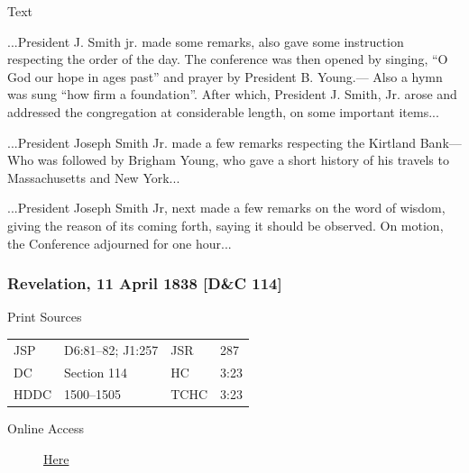 				\begin{description}
					\item[Text]
				\end{description}
				
					...President J. Smith jr. made some remarks, also gave some instruction respecting the order of the day. The conference was then opened by singing, ``O God our hope in ages past'' and prayer by President B. Young.--- Also a hymn was sung ``how firm a foundation''. After which, President J. Smith, Jr. arose and addressed the congregation at considerable length, on some important items...
					
					...President Joseph Smith Jr. made a few remarks respecting the Kirtland Bank--- Who was followed by Brigham Young, who gave a short history of his travels to Massachusetts and New York...
					
					...President Joseph Smith Jr, next made a few remarks on the word of wisdom, giving the reason of its coming forth, saying it should be observed. On motion, the Conference adjourned for one hour...
					
		\subsubsection{Revelation, 11 April 1838 [D\&C 114]}
			\label{EMS-1838-JS-11-APR-1838}
			
			\begin{description}
					\item[Print Sources]
				\end{description}

					\begin{tabular}{p{0.5in}p{1in}p{0.5in}p{1in}}
					JSP	 	& D6:81--82; J1:257				& JSR 		& 287 \\
					DC	 	& Section 114		& HC 		& 3:23 \\
					HDDC 	& 1500--1505		& TCHC 		& 3:23 \\
					\end{tabular}
				
				\begin{description}
					\item[Online Access] \href{https://www.josephsmithpapers.org/paper-summary/revelation-11-april-1838-dc-114/1}{Here}
				\end{description}
				
